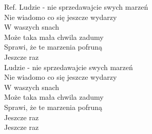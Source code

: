 \begin{flushleft}
\vskip 3mm
Ref. Ludzie - nie sprzedawajcie swych marzeń\\
\hspace{0.9cm}Nie wiadomo co się jeszcze wydarzy\\
\hspace{0.9cm}W waszych snach\\
\hspace{0.9cm}Może taka mała chwila zadumy\\
\hspace{0.9cm}Sprawi, że te marzenia pofruną\\
\hspace{0.9cm}Jeszcze raz\\
\vskip 3mm
\hspace{0.9cm}Ludzie - nie sprzedawajcie swych marzeń\\
\hspace{0.9cm}Nie wiadomo co się jeszcze wydarzy\\
\hspace{0.9cm}W waszych snach\\
\hspace{0.9cm}Może taka mała chwila zadumy\\
\hspace{0.9cm}Sprawi, że te marzenia pofruną\\
\hspace{0.9cm}Jeszcze raz\\
\hspace{0.9cm}Jeszcze raz\\
\end{flushleft}
\clearpage
